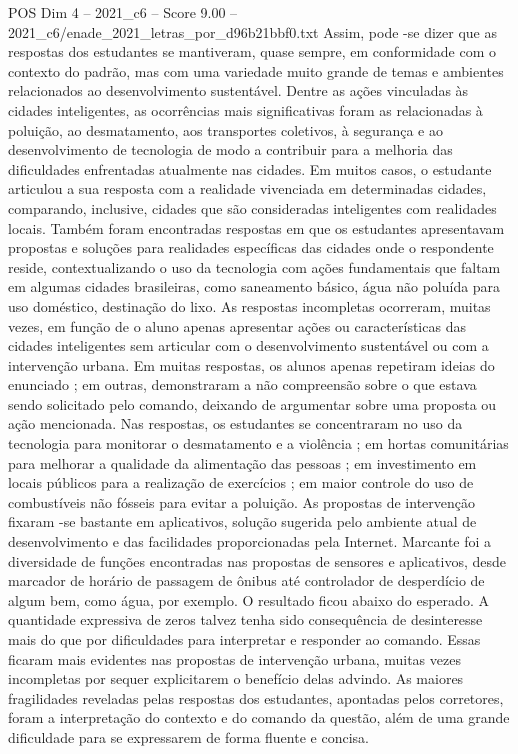 \begin{textsample}{POS Dim 4 – 2021\_c6 – Score 9.00 – 2021\_c6/enade\_2021\_letras\_por\_d96b21bbf0.txt}
Assim, pode -se dizer que as respostas dos estudantes se mantiveram, quase sempre, em conformidade com o contexto do padrão, mas com uma variedade muito grande de temas e ambientes relacionados ao desenvolvimento sustentável.
Dentre as ações vinculadas às cidades inteligentes, as ocorrências mais significativas foram as relacionadas à poluição, ao desmatamento, aos transportes coletivos, à segurança e ao desenvolvimento de tecnologia de modo a contribuir para a melhoria das dificuldades enfrentadas atualmente nas cidades.
Em muitos casos, o estudante articulou a sua resposta com a realidade vivenciada em determinadas cidades, comparando, inclusive, cidades que são consideradas inteligentes com realidades locais.
Também foram encontradas respostas em que os estudantes apresentavam propostas e soluções para realidades específicas das cidades onde o respondente reside, contextualizando o uso da tecnologia com ações fundamentais que faltam em algumas cidades brasileiras, como saneamento básico, água não poluída para uso doméstico, destinação do lixo.
As respostas incompletas ocorreram, muitas vezes, em função de o aluno apenas apresentar ações ou características das cidades inteligentes sem articular com o desenvolvimento sustentável ou com a intervenção urbana.
Em muitas respostas, os alunos apenas repetiram ideias do enunciado ; em outras, demonstraram a não compreensão sobre o que estava sendo solicitado pelo comando, deixando de argumentar sobre uma proposta ou ação mencionada.
Nas respostas, os estudantes se concentraram no uso da tecnologia para monitorar o desmatamento e a violência ; em hortas comunitárias para melhorar a qualidade da alimentação das pessoas ; em investimento em locais públicos para a realização de exercícios ; em maior controle do uso de combustíveis não fósseis para evitar a poluição.
As propostas de intervenção fixaram -se bastante em aplicativos, solução sugerida pelo ambiente atual de desenvolvimento e das facilidades proporcionadas pela Internet.
Marcante foi a diversidade de funções encontradas nas propostas de sensores e aplicativos, desde marcador de horário de passagem de ônibus até controlador de desperdício de algum bem, como água, por exemplo.
O resultado ficou abaixo do esperado.
A quantidade expressiva de zeros talvez tenha sido consequência de desinteresse mais do que por dificuldades para interpretar e responder ao comando.
Essas ficaram mais evidentes nas propostas de intervenção urbana, muitas vezes incompletas por sequer explicitarem o benefício delas advindo.
As maiores fragilidades reveladas pelas respostas dos estudantes, apontadas pelos corretores, foram a interpretação do contexto e do comando da questão, além de uma grande dificuldade para se expressarem de forma fluente e concisa.

\end{textsample}
